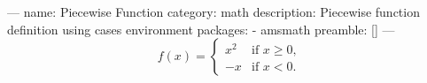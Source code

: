 ---
name: Piecewise Function
category: math
description: Piecewise function definition using cases environment
packages:
  - amsmath
preamble: []
---
\[
f(x) = \begin{cases}
  x^2       & \text{if } x \geq 0, \\
  -x        & \text{if } x < 0.
\end{cases}
\]
